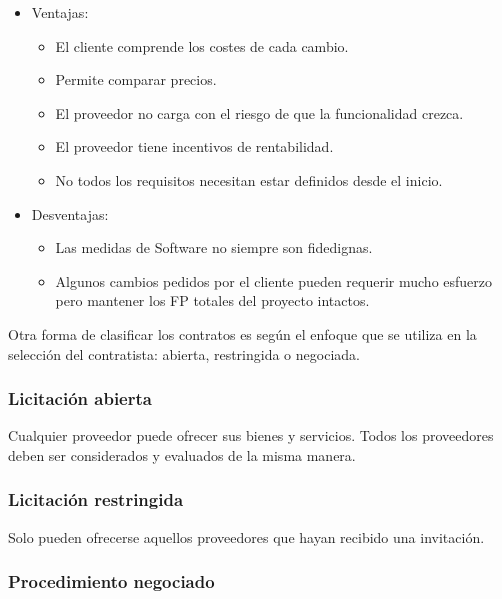 \documentclass[12pt]{article}
\begin{document}
\begin{itemize}
    \item Ventajas:
    
    \begin{itemize}
        \item El cliente comprende los costes de cada cambio.
        \item Permite comparar precios.
        \item El proveedor no carga con el riesgo de que la funcionalidad crezca.
        \item El proveedor tiene incentivos de rentabilidad.
        \item No todos los requisitos necesitan estar definidos desde el inicio.
    \end{itemize}
    
    \item Desventajas:
    
    \begin{itemize}
        \item Las medidas de Software no siempre son fidedignas.
        \item Algunos cambios pedidos por el cliente pueden requerir mucho esfuerzo pero mantener los FP totales del proyecto intactos.
    \end{itemize}
    
\end{itemize}

{Otra forma de clasificar los contratos es según el enfoque que se utiliza en la selección del contratista: abierta, restringida o negociada.}

\subsubsection{Licitación abierta}
\label{10.2.4}

{Cualquier proveedor puede ofrecer sus bienes y servicios. Todos los proveedores deben ser considerados y evaluados de la misma manera.}

\subsubsection{Licitación restringida}
\label{10.2.5}

{Solo pueden ofrecerse aquellos proveedores que hayan recibido una invitación.}

\subsubsection{Procedimiento negociado}
\label{10.2.6}
\end{document}
